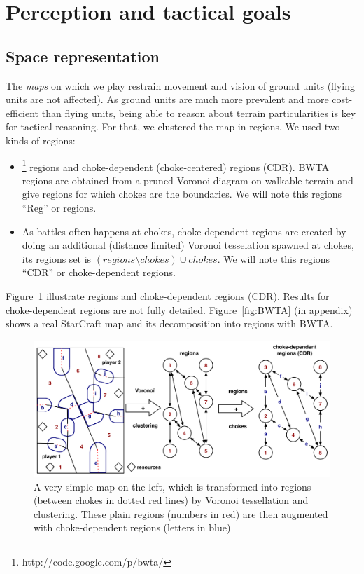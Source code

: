 \section{Perception and tactical goals}
\subsection{Space representation}
The \textit{maps} on which we play restrain movement and vision of ground units (flying units are not affected). As ground units are much more prevalent and more cost-efficient than flying units, being able to reason about terrain particularities is key for tactical reasoning. For that, we clustered the map in regions. 
We used two kinds of regions: 
\begin{itemize}
    \item {}\footnote{http://code.google.com/p/bwta/} regions and choke-dependent (choke-centered) regions (CDR). BWTA regions are obtained from a pruned Voronoi diagram on walkable terrain \citep{Perkins2010} and give regions for which chokes are the boundaries. We will note this regions ``Reg'' or regions.
    \item As battles often happens at chokes, choke-dependent regions are created by doing an additional (distance limited) Voronoi tesselation spawned at chokes, its regions set is $(regions \setminus chokes) \cup chokes$. We will note this regions ``CDR'' or choke-dependent regions.
\end{itemize}
Figure~\ref{fig:terrainanalysis} illustrate regions and choke-dependent regions (CDR). Results for choke-dependent regions are not fully detailed. Figure~\ref{fig:BWTA} (in appendix) shows a real StarCraft map and its decomposition into regions with BWTA.

\begin{figure}[!h]
\begin{center}
\includegraphics[width=0.99\columnwidth]{images/terrain_analysis.png}
\caption{A very simple map on the left, which is transformed into regions (between chokes in dotted red lines) by Voronoi tessellation and clustering. These plain regions (numbers in red) are then augmented with choke-dependent regions (letters in blue)}%
\label{fig:terrainanalysis}
\end{center}
\end{figure}

